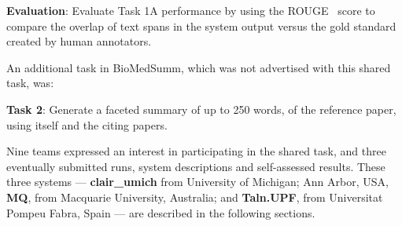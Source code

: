 \documentclass[11pt]{article}
\begin{document}
{\bf Evaluation}: Evaluate Task 1A performance by using the ROUGE~\cite{Lin:2004} score to 
compare the overlap of text spans in the system output versus the gold standard created by 
human annotators.

An additional task in BioMedSumm, which was not advertised with this shared task, was:

{\bf Task 2}: Generate a faceted summary of up to 250 words, of the 
reference paper, using itself and the citing papers.

Nine teams expressed an interest in participating in the shared task,
and three eventually submitted runs, system descriptions and
self-assessed results.  These three systems --- {\bf clair\_umich}
from University of Michigan; Ann Arbor, USA, {\bf MQ}, from Macquarie
University, Australia; and {\bf Taln.UPF}, from Universitat Pompeu
Fabra, Spain --- are described in the following sections.

\end{document}
